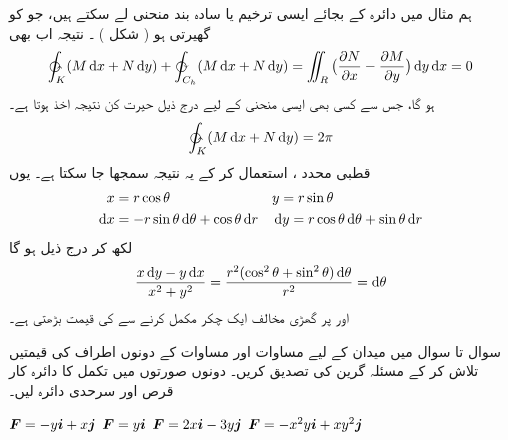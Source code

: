   ہم مثال    میں دائرہ  کے بجائے     ایسی ترخیم  یا  سادہ بند منحنی    لے سکتے ہیں، جو   کو   گھیرتی ہو ( شکل   ) ۔ نتیجہ اب بھی 
\begin{align*}
\ointctrclockwise_K ( M \dif x + N \dif y ) + \varointclockwise_{C_h} ( M \dif x + N \dif y) = \iint_R \big(\frac{\partial N}{\partial x} - \frac{\partial M}{\partial y}\big) \dif y \dif x = 0 
\end{align*}
ہو گا،  جس سے کسی بھی  ایسی منحنی    کے لیے درج ذیل حیرت  کن نتیجہ اخذ ہوتا ہے۔ 
\begin{align*}
\ointctrclockwise_K ( M \dif x + N \dif y ) = 2 \pi 
\end{align*}
 قطبی محدد   ،  استعمال کر کے یہ نتیجہ سمجھا جا سکتا ہے۔   یوں  
\begin{align*}
  x& = r\cos{\theta} && y = r\sin{\theta}\\   
 \dif x &= -r \sin{\theta} \dif \theta + \cos{\theta} \dif r  &&  \dif y = r \cos{\theta} \dif \theta + \sin{\theta} \dif r 
\end{align*}
 لکھ کر درج ذیل ہو گا
\begin{align*}
  \frac{x \dif y - y\dif x}{x^2 + y^2} = \frac{r^2( \cos^2{\theta} + \sin^2{\theta}) \dif \theta}{r^2} = \dif \theta    
\end{align*}
 اور    پر گھڑی مخالف ایک   چکر  مکمل  کرنے سے    کی قیمت   بڑھتی ہے۔
 


سوال  تا سوال  میں میدان   کے لیے مساوات     اور  مساوات    کے دونوں اطراف کی قیمتیں تلاش کر کے مسئلہ  گرین کی تصدیق کریں۔ دونوں صورتوں میں تکمل کا دائرہ کار قرص     اور  سرحدی دائرہ    لیں۔

\({{\boldsymbol{F}}} = -y{\boldsymbol{i}} + x{\boldsymbol{j}}\)
\({{\boldsymbol{F}}} = y{\boldsymbol{i}}\)
\({{\boldsymbol{F}}} = 2x{\boldsymbol{i}} - 3y{\boldsymbol{j}}\)
\({{\boldsymbol{F}}} = -x^2y{\boldsymbol{i}} + xy^2{\boldsymbol{j}}\)

